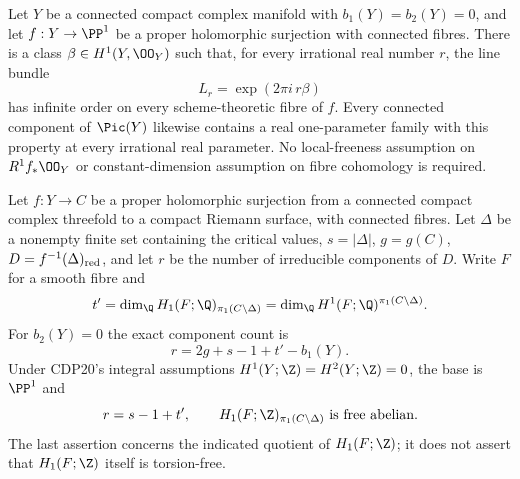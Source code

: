 \begin{proposition}\hypertarget{tag-01G7}{}\label{cdp:st:D.1.9}


Let $Y$ be a connected compact complex manifold with
$b_1(Y)=b_2(Y)=0$, and let $f:Y\to\PP^1$ be a proper
holomorphic surjection with connected fibres. There is a class
$\beta\in H^1(Y,\OO_Y)$ such that, for every irrational real number
$r$, the line bundle
\[
L_r=\exp(2\pi i\,r\beta)
\]
has infinite order on every scheme-theoretic fibre of $f$.
Every connected component of $\Pic(Y)$ likewise contains a real
one-parameter family with this property at every irrational real
parameter.
No local-freeness assumption on $R^1f_*\OO_Y$ or constant-dimension
assumption on fibre cohomology is required.
\end{proposition}

\begin{proposition}\hypertarget{tag-01G0}{}\label{cdp:st:D.1.2}


Let $f:Y\to C$ be a proper holomorphic surjection from a connected
compact complex threefold to a compact Riemann surface, with
connected fibres. Let $\Delta$ be a nonempty finite set containing
the critical values, $s=|\Delta|$, $g=g(C)$,
$D=f^{-1}(\Delta)_{\rm red}$, and let $r$ be the number of
irreducible components of $D$. Write $F$ for a smooth fibre and
\[
t'=\dim_{\Q}H_1(F;\Q)_{\pi_1(C\setminus\Delta)}
   =\dim_{\Q}H^1(F;\Q)^{\pi_1(C\setminus\Delta)}.
\]
For $b_2(Y)=0$ the exact component count is
\[
\boxed{\quad r=2g+s-1+t'-b_1(Y).\quad}
\]
Under CDP20's integral assumptions
$H^1(Y;\Z)=H^2(Y;\Z)=0$, the base is $\PP^1$ and
\[
r=s-1+t',\qquad
H_1(F;\Z)_{\pi_1(C\setminus\Delta)}\text{ is free abelian}.
\]
The last assertion concerns the indicated quotient of $H_1(F;\Z)$;
it does not assert that $H_1(F;\Z)$ itself is torsion-free.
\end{proposition}

